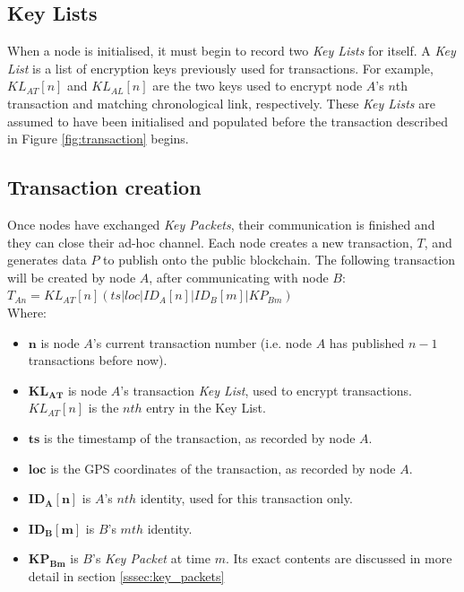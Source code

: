 \subsection{Key Lists} \label{ssec:key_lists}
When a node is initialised, it must begin to record two \textit{Key Lists} for itself. A \textit{Key List} is a list of encryption keys previously used for transactions. For example, $KL_{AT}[n]$ and $KL_{AL}[n]$ are the two keys used to encrypt node $A$'s $n$th transaction and matching chronological link, respectively. These \textit{Key Lists} are assumed to have been initialised and populated before the transaction described in Figure \ref{fig:transaction} begins.

\subsection{Transaction creation}
Once nodes have exchanged \textit{Key Packets}, their communication is finished and they can close their ad-hoc channel. Each node creates a new transaction, $T$, and generates data $P$ to publish onto the public blockchain. The following transaction will be created by node $A$, after communicating with node $B$:
\\

$T_{An} = KL_{AT}[n](ts|loc|ID_{A}[n]|ID_{B}[m]|KP_{Bm})$
\\

Where:
\begin{itemize}[noitemsep,topsep=0pt]
	\item[] $\mathbf{n}$ is node $A$'s current transaction number (i.e. node $A$ has published $n-1$ transactions before now).
	\item[] $\mathbf{KL_{AT}}$ is node $A$'s transaction \textit{Key List}, used to encrypt transactions. $KL_{AT}[n]$ is the $nth$ entry in the Key List.
	\item[] $\mathbf{ts}$ is the timestamp of the transaction, as recorded by node $A$.
	\item[] $\mathbf{loc}$ is the GPS coordinates of the transaction, as recorded by node $A$.
	\item[] $\mathbf{ID_{A}[n]}$ is $A$'s $nth$ identity, used for this transaction only.
	\item[] $\mathbf{ID_{B}[m]}$ is $B$'s $mth$ identity.
	\item[] $\mathbf{KP_{Bm}}$ is $B$'s \textit{Key Packet} at time $m$. Its exact contents are discussed in more detail in section \ref{sssec:key_packets}
\end{itemize}

